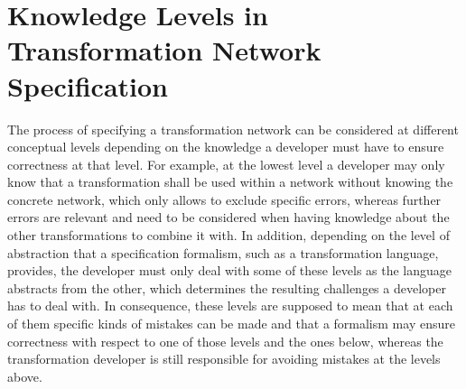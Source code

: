 \section{Knowledge Levels in Transformation Network Specification}

The process of specifying a transformation network can be considered at different conceptual levels depending on the knowledge a developer must have to ensure correctness at that level.
For example, at the lowest level a developer may only know that a transformation shall be used within a network without knowing the concrete network, which only allows to exclude specific errors, whereas further errors are relevant and need to be considered when having knowledge about the other transformations to combine it with.
In addition, depending on the level of abstraction that a specification formalism, such as a transformation language, provides, the developer must only deal with some of these levels as the language abstracts from the other, which determines the resulting challenges a developer has to deal with.
In consequence, these levels are supposed to mean that at each of them specific kinds of mistakes can be made and that a formalism may ensure correctness with respect to one of those levels and the ones below, whereas the transformation developer is still responsible for avoiding mistakes at the levels above.

